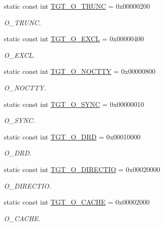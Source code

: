 \begin{Indent}{\bf }
\begin{DoxyCompactItemize}
static const int \hyperlink{classMipsLinux_a4f892ee6e1424a2becd859b0bef1f18b}{TGT\_\-O\_\-TRUNC} = 0x00000200
\begin{DoxyCompactList}\small\item\em O\_\-TRUNC. \item\end{DoxyCompactList}\item 
static const int \hyperlink{classMipsLinux_a10d5d118d15b51ebdd4b16dc78342d1d}{TGT\_\-O\_\-EXCL} = 0x00000400
\begin{DoxyCompactList}\small\item\em O\_\-EXCL. \item\end{DoxyCompactList}\item 
static const int \hyperlink{classMipsLinux_adfd4240281579e5f60c5e22c601225d8}{TGT\_\-O\_\-NOCTTY} = 0x00000800
\begin{DoxyCompactList}\small\item\em O\_\-NOCTTY. \item\end{DoxyCompactList}\item 
static const int \hyperlink{classMipsLinux_abf43ab05d2a5b6b8113952160d8565db}{TGT\_\-O\_\-SYNC} = 0x00000010
\begin{DoxyCompactList}\small\item\em O\_\-SYNC. \item\end{DoxyCompactList}\item 
static const int \hyperlink{classMipsLinux_a83feaef06c27596d44d489ec51e197fd}{TGT\_\-O\_\-DRD} = 0x00010000
\begin{DoxyCompactList}\small\item\em O\_\-DRD. \item\end{DoxyCompactList}\item 
static const int \hyperlink{classMipsLinux_a0a80dc00bd46d433f1ff0d38da2f5ded}{TGT\_\-O\_\-DIRECTIO} = 0x00020000
\begin{DoxyCompactList}\small\item\em O\_\-DIRECTIO. \item\end{DoxyCompactList}\item 
static const int \hyperlink{classMipsLinux_ab30a547e309825ec5f9c5d11a6da543c}{TGT\_\-O\_\-CACHE} = 0x00002000
\begin{DoxyCompactList}\small\item\em O\_\-CACHE. \item\end{DoxyCompactList}\item 

\end{DoxyCompactItemize}
\end{Indent}
